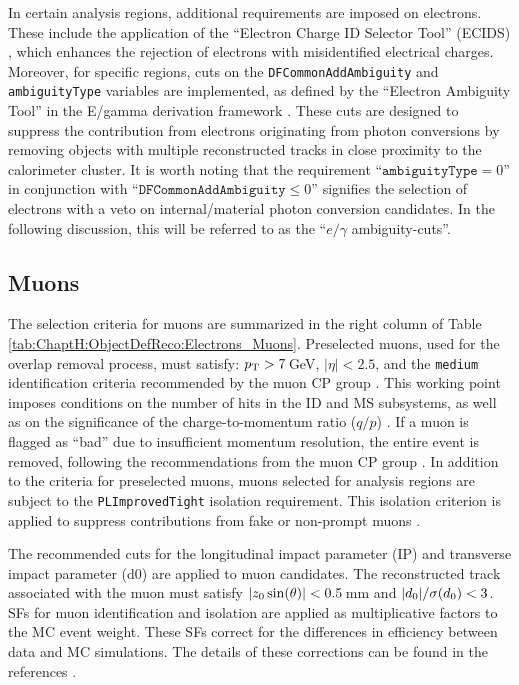 In certain analysis regions, additional requirements are imposed on electrons. These include the application of 
the \enquote{Electron Charge ID Selector Tool} (ECIDS) \cite{twiki-ECIDS}, which enhances the rejection of electrons 
with misidentified electrical charges. Moreover, for specific regions, cuts on the \texttt{DFCommonAddAmbiguity} 
and \texttt{ambiguityType} variables are implemented, as defined by the \enquote{Electron Ambiguity Tool} in 
the E/gamma derivation framework \cite{twiki-elAmbiguity}. These cuts are designed to suppress the contribution 
from electrons originating from photon conversions by removing objects with multiple reconstructed tracks in close 
proximity to the calorimeter cluster.
It is worth noting that the requirement \enquote{$\texttt{ambiguityType} = 0$} in conjunction 
with \enquote{$\texttt{DFCommonAddAmbiguity} \leq 0$} signifies the selection of electrons with a 
veto on internal/material photon conversion candidates. In the following discussion, this will be referred 
to as the \enquote{$e/\gamma$ ambiguity-cuts}.

 
%
%
\subsection{Muons}
\label{sec:ChaptH:ObjectDefReco:muon}
The selection criteria for muons are summarized in the right column of Table \ref{tab:ChaptH:ObjectDefReco:Electrons_Muons}.
Preselected muons, used for the overlap removal process, must satisfy: $p_{\text{T}} > 7\,$GeV, $|\eta| < 2.5$, 
and the \texttt{medium} identification criteria recommended by the muon CP group \cite{MCPRecommendations}. 
This working point imposes conditions on the number of hits in the ID and MS subsystems, as well as 
on the significance of the charge-to-momentum ratio ($q/p$) \cite{PERF-2015-10}\cite{MUON-2018-03}. 
If a muon is flagged as \enquote{bad} due to insufficient momentum resolution, the entire event is removed,
following the recommendations from the muon CP group \cite{twiki-MuonSelection}.
In addition to the criteria for preselected muons, muons selected for analysis regions are subject 
to the \texttt{PLImprovedTight} isolation requirement. This isolation criterion is applied to suppress 
contributions from fake or non-prompt muons \cite{twiki-IFF}\cite{twiki-ISOWP}\cite{PLIV}.

The recommended cuts for the longitudinal impact parameter (IP) and transverse 
impact parameter (d0) are applied to muon candidates. The reconstructed track 
associated with the muon must satisfy $|z_{0} \sin(\theta)| < 0.5\,$mm and $|d_{0}| / \sigma(d_{0}) < 3$. 
SFs for muon identification and isolation are applied as multiplicative factors to the MC event weight. 
These SFs correct for the differences in efficiency between data and MC simulations. 
The details of these corrections can be found in the references \cite{MCPRecommendations}\cite{PERF-2015-10}.

